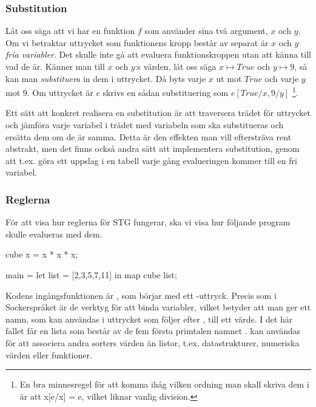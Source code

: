 \documentclass[../Core]{subfiles}
\begin{document}


\subsubsection{Substitution}

Låt oss säga att vi har en funktion $f$ som använder sina två 
argument, $x$ och $y$. Om vi betraktar uttrycket som funktionens 
kropp består av separat är $x$ och $y$ 
\emph{fria variabler}. Det skulle inte gå att evaluera funktionskroppen utan
att känna till vad de är. Känner man till $x$ och $y$:s värden, låt oss säga
$x \mapsto True$ och $y \mapsto 9$, så kan man \emph{substituera} in dem i 
uttrycket. Då byts varje $x$ ut mot $True$ och varje $y$ mot $9$. Om uttrycket 
är $e$ skrivs en sådan substituering som $e[True/x, 9/y]$
\footnote{En bra minnesregel för att komma ihåg vilken ordning man skall 
          skriva dem i är att x[e/x] = e, vilket liknar vanlig division.}. 

    Ett sätt att konkret realisera en substitution är att traversera trädet
för uttrycket och jämföra varje variabel i trädet med variabeln som ska 
substitueras och ersätta dem om de är samma. Detta är den effekten man vill 
eftersträva rent abstrakt, men det finns också andra sätt att implementera 
substitution, genom att t.ex. göra ett uppslag i en tabell varje gång 
evalueringen kommer till en fri variabel. 

\subsubsection{Reglerna}

För att visa hur reglerna
för STG  fungerar, ska vi visa hur följande program skulle evalueras med dem.

\begin{codeEx}
cube x = x * x * x;

main = let list = [2,3,5,7,11]
        in map cube list;
\end{codeEx}

Kodens ingångsfunktionen är , som börjar med ett -uttryck.
Precis som i Sockerspråket är de verktyg för att binda variabler, vilket betyder att man ger ett
namn, som kan användas i uttrycket som följer efter ,
till ett värde. I det här fallet får
en lista som består av de fem första primtalen namnet .
 kan användas för att associera andra sorters värden än listor,
t.ex. datastrukturer, numeriska värden eller funktioner.
\end{document}
